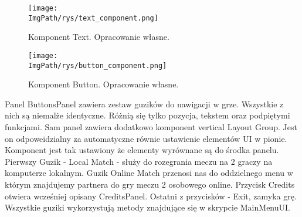 \documentclass[a4paper,12pt,twoside,openany]{report}
\newcommand{\ImgPath}{.}
\begin{document}
\begin{figure}[H]
	\begin{center}
\centering
\texttt{[image: \\ImgPath/rys/text\_component.png]}
\end{center}
	\caption{Komponent Text. Opracowanie własne.}
	\label{text_component}
\end{figure}


\begin{figure}[H]
	\begin{center}
\centering
\texttt{[image: \\ImgPath/rys/button\_component.png]}
\end{center}
	\caption{Komponent Button. Opracowanie własne.}
	\label{button_component}
\end{figure}

Panel ButtonsPanel zawiera zestaw guzików do nawigacji w grze. Wszystkie z nich są niemalże identyczne. Różnią się tylko pozycja, tekstem oraz podpiętymi funkcjami. Sam panel zawiera dodatkowo komponent vertical Layout Group. Jest on odpoweidzialny za automatyczne równie ustawienie elementów UI w pionie. Komponent jest tak ustawiony że elementy wyrównane są do środka panelu. Pierwszy Guzik - Local Match - służy do rozegrania meczu na 2 graczy na komputerze lokalnym. Guzik Online Match przenosi nas do oddzielnego menu w którym znajdujemy partnera do gry meczu 2 osobowego online. Przycisk Credits otwiera wcześniej opisany CreditsPanel. Ostatni z przycisków - Exit, zamyka grę. Wszystkie guziki wykorzystują metody znajdujące się w skrypcie MainMenuUI.
\end{document}
